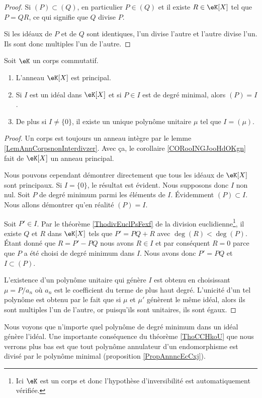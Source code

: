 \begin{proof}
    Si \( (P)\subset (Q)\), en particulier \( P\in(Q)\) et il existe \( R\in\eK[X]\) tel que \( P=QR\), ce qui signifie que \( Q\) divise \( P\).

    Si les idéaux de \( P\) et de \( Q\) sont identiques, l'un divise l'autre et l'autre divise l'un. Ils sont donc multiples l'un de l'autre.
\end{proof}

\begin{theorem}     \label{ThoCCHkoU}
    Soit \( \eK\) un corps commutatif.
    \begin{enumerate}
        \item
            L'anneau \( \eK[X]\) est principal. 
        \item
            Si \( I\) est un idéal dans \( \eK[X]\) et si \( P \in I\) est de degré minimal, alors \( (P)=I\).
        \item   \label{ITEMooASHKooZqkiCH}
            De plus si \( I\neq \{  0\}\), il existe un unique polynôme unitaire \( \mu\) tel que \( I=(\mu)\).
    \end{enumerate}
\end{theorem}

\begin{proof}

    Un corps est toujours un anneau intègre par le lemme \ref{LemAnnCorpsnonInterdivzer}. Avec ça, le corollaire \ref{CORooINGJooHdOKgn} fait de \( \eK[X]\) un anneau principal.  

    Nous pouvons cependant démontrer directement que tous les idéaux de \( \eK[X]\) sont principaux. Si \( I=\{ 0 \}\), le résultat est évident. Nous supposons donc \( I\) non nul. Soit \( P\) de degré minimum parmi les éléments de \( I\). Évidemment \( (P)\subset I\). Nous allons démontrer qu'en réalité \( (P)=I\).

    Soit \( P'\in I\). Par le théorème \ref{ThodivEuclPsFexf} de la division euclidienne\footnote{Ici \( \eK\) est un corps et donc l'hypothèse d'inversibilité est automatiquement vérifiée.}, il existe \( Q\) et \( R\) dans \( \eK[X]\) tels que \( P'=PQ+R\) avec \( \deg(R)<\deg(P)\). Étant donné que \( R=P'-PQ\) nous avons \( R\in I\) et par conséquent \( R=0\) parce que \( P\) a été choisi de degré minimum dans \( I\). Nous avons donc \( P'=PQ\) et \( I\subset (P)\).

    L'existence d'un polynôme unitaire qui génère \( I\) est obtenu en
    choisissant \( \mu =P/a_n\) où \( a_n\) est le coefficient du terme
    de plus haut degré. L'unicité d'un tel polynôme est obtenu par le
    fait que si \( \mu \) et \( \mu' \) génèrent le même idéal, alors
    ils sont multiples l'un de l'autre, or puisqu'ils sont unitaires,
    ils sont égaux.
\end{proof}
Nous voyons que n'importe quel polynôme de degré minimum dans un idéal génère l'idéal. Une importante conséquence du théorème \ref{ThoCCHkoU} que nous verrons plus bas est que tout polynôme annulateur d'un endomorphisme est divisé par le polynôme minimal (proposition \ref{PropAnnncEcCxj}).




